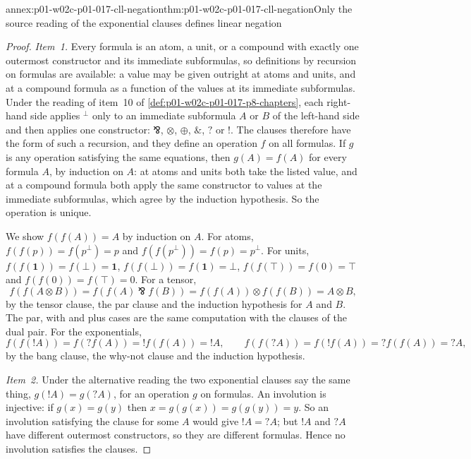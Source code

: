 \begin{annexitem}{annex:p01-w02c-p01-017-cll-negation}{thm:p01-w02c-p01-017-cll-negation}{Only the source reading of the exponential clauses defines linear negation}
\begin{proof}
\emph{Item~1.}  Every formula is an atom, a unit, or a compound with
exactly one outermost constructor and its immediate subformulas, so
definitions by recursion on formulas are available: a value may be given
outright at atoms and units, and at a compound formula as a function of
the values at its immediate subformulas.  Under the reading of item~10 of
\cref{def:p01-w02c-p01-017-p8-chapters}, each right-hand side applies
\({}^\perp\) only to an immediate subformula \(A\) or \(B\) of the
left-hand side and then applies one constructor: \(\bindnasrepma\),
\(\otimes\), \(\oplus\), \(\mathbin{\&}\), \(?\) or \(!\).  The clauses
therefore have the form of such a recursion, and they define an operation
\(f\) on all formulas.  If \(g\) is any operation satisfying the same
equations, then \(g(A)=f(A)\) for every formula \(A\), by induction on
\(A\): at atoms and units both take the listed value, and at a compound
formula both apply the same constructor to values at the immediate
subformulas, which agree by the induction hypothesis.  So the operation is
unique.

We show \(f(f(A))=A\) by induction on \(A\).  For atoms,
\(f(f(p))=f(p^\perp)=p\) and \(f(f(p^\perp))=f(p)=p^\perp\).  For units,
\(f(f(\mathbf 1))=f(\bot)=\mathbf 1\), \(f(f(\bot))=f(\mathbf 1)=\bot\),
\(f(f(\top))=f(0)=\top\) and \(f(f(0))=f(\top)=0\).  For a tensor,
\[
 f(f(A\otimes B))=f(f(A)\bindnasrepma f(B))=f(f(A))\otimes f(f(B))
 =A\otimes B,
\]
by the tensor clause, the par clause and the induction hypothesis for
\(A\) and \(B\).  The par, with and plus cases are the same computation
with the clauses of the dual pair.  For the exponentials,
\[
 f(f(!A))=f(?f(A))=!f(f(A))=!A,
 \qquad
 f(f(?A))=f(!f(A))=?f(f(A))=?A,
\]
by the bang clause, the why-not clause and the induction hypothesis.

\emph{Item~2.}  Under the alternative reading the two exponential clauses
say the same thing, \(g(!A)=g(?A)\), for an operation \(g\) on formulas.
An involution is injective: if \(g(x)=g(y)\) then
\(x=g(g(x))=g(g(y))=y\).  So an involution satisfying the clause for some
\(A\) would give \(!A=?A\); but \(!A\) and \(?A\) have different outermost
constructors, so they are different formulas.  Hence no involution
satisfies the clauses.


\end{proof}
\end{annexitem}
